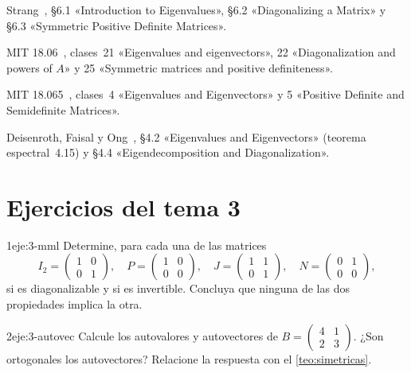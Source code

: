 \begin{lecturas}
\item Strang~\cite{strang-ila}, §6.1 «Introduction to Eigenvalues», §6.2 «Diagonalizing a Matrix» y §6.3 «Symmetric Positive Definite Matrices».
\item MIT 18.06~\cite{mit1806}, clases~21 «Eigenvalues and eigenvectors», 22 «Diagonalization and powers of $A$» y 25 «Symmetric matrices and positive definiteness».
\item MIT 18.065~\cite{mit18065}, clases~4 «Eigenvalues and Eigenvectors» y 5 «Positive Definite and Semidefinite Matrices».
\item Deisenroth, Faisal y Ong~\cite{mml}, §4.2 «Eigenvalues and Eigenvectors» (teorema espectral~4.15) y §4.4 «Eigendecomposition and Diagonalization».
\end{lecturas}

\section*{Ejercicios del tema 3}

\begin{ejercicio}{1}{eje:3-mml}
Determine, para cada una de las matrices
\[
I_2=\begin{pmatrix}1&0\\0&1\end{pmatrix},\quad P=\begin{pmatrix}1&0\\0&0\end{pmatrix},\quad J=\begin{pmatrix}1&1\\0&1\end{pmatrix},\quad N=\begin{pmatrix}0&1\\0&0\end{pmatrix},
\]
si es diagonalizable y si es invertible. Concluya que ninguna de las dos propiedades implica la otra.
\end{ejercicio}

\begin{ejercicio}{2}{eje:3-autovec}
Calcule los autovalores y autovectores de $B=\begin{pmatrix}4&1\\2&3\end{pmatrix}$. ¿Son ortogonales los autovectores? Relacione la respuesta con el \cref{teo:simetricas}.
\end{ejercicio}

